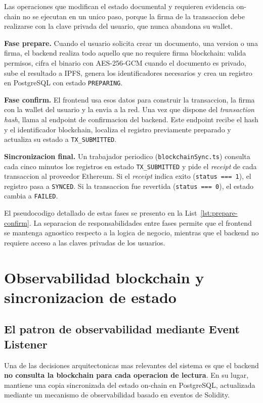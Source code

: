 \documentclass[11pt, a4paper]{article}
\begin{document}
Las operaciones que modifican el estado documental y requieren evidencia on-chain no se ejecutan en un unico paso, porque la firma de la transaccion debe realizarse con la clave privada del usuario, que nunca abandona su wallet.

\textbf{Fase prepare.} Cuando el usuario solicita crear un documento, una version o una firma, el backend realiza todo aquello que no requiere firma blockchain: valida permisos, cifra el binario con AES-256-GCM cuando el documento es privado, sube el resultado a IPFS, genera los identificadores necesarios y crea un registro en PostgreSQL con estado \texttt{PREPARING}.

\textbf{Fase confirm.} El frontend usa esos datos para construir la transaccion, la firma con la wallet del usuario y la envia a la red. Una vez que dispone del \textit{transaction hash}, llama al endpoint de confirmacion del backend. Este endpoint recibe el hash y el identificador blockchain, localiza el registro previamente preparado y actualiza su estado a \texttt{TX\_SUBMITTED}.

\textbf{Sincronizacion final.} Un trabajador periodico (\texttt{blockchainSync.ts}) consulta cada cinco minutos los registros en estado \texttt{TX\_SUBMITTED} y pide el \textit{receipt} de cada transaccion al proveedor Ethereum. Si el \textit{receipt} indica exito (\texttt{status === 1}), el registro pasa a \texttt{SYNCED}. Si la transaccion fue revertida (\texttt{status === 0}), el estado cambia a \texttt{FAILED}.

El pseudocodigo detallado de estas fases se presento en la List~\ref{lst:prepare-confirm}. La separacion de responsabilidades entre fases permite que el frontend se mantenga agnostico respecto a la logica de negocio, mientras que el backend no requiere acceso a las claves privadas de los usuarios.

\section{Observabilidad blockchain y sincronizacion de estado}

\subsection{El patron de observabilidad mediante Event Listener}

Una de las decisiones arquitectonicas mas relevantes del sistema es que el backend \textbf{no consulta la blockchain para cada operacion de lectura}. En su lugar, mantiene una copia sincronizada del estado on-chain en PostgreSQL, actualizada mediante un mecanismo de observabilidad basado en eventos de Solidity.
\end{document}

